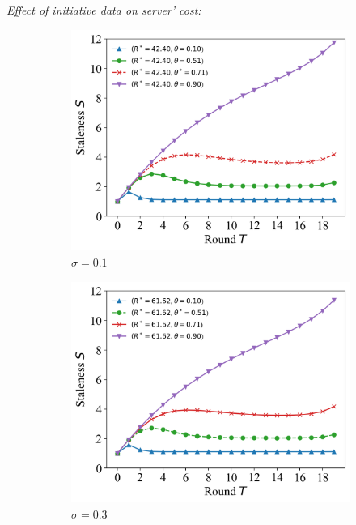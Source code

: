 \documentclass{article}
\theoremstyle{plain}
\theoremstyle{definition}
\theoremstyle{remark}
\begin{document}
\textit{Effect of initiative data on server' cost:}
\begin{figure}
	\begin{subfigure}{0.31\textwidth}
		\centering
    \includegraphics[width=\textwidth]{figures/figure_64_A.png}
    \caption{$\sigma=0.1$}
	\end{subfigure}
  \quad
	\begin{subfigure}{0.31\textwidth}
		\centering
		\includegraphics[width=\textwidth]{figures/figure_64_B.png}
    \caption{$\sigma=0.3$}
	\end{subfigure}
  \quad
  \begin{subfigure}{0.31\textwidth}

\end{subfigure}
\end{figure}
\end{document}
